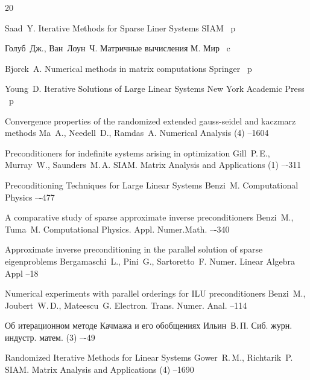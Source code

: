 \begin{thebibliography}{20}

\by Saad~Y.
\book Iterative Methods for Sparse Liner Systems
\publ SIAM
~p

\by Голуб~Дж., Ван~Лоун~Ч.
\book Матричные вычисления
\publaddr М.
\publ Мир
~c

\by Bjorck~A.
\book Numerical methods in matrix computations
\publ Springer
~p

\by Young~D.
\book Iterative Solutions of Large Linear Systems
\publaddr New York
\publ Academic Press
~p

\paper Convergence properties of the randomized extended gauss-seidel and kaczmarz methods
\by Ma~A., Needell~D., Ramdas~A.
\jour Numerical Analysis
(4)
--1604

\paper Preconditioners for indefinite systems arising in optimization
\by Gill~P.\,E., Murray~W., Saunders~M.\,A.
\jour SIAM. Matrix Analysis and Applications
(1)
–-311

\paper Preconditioning Techniques for Large Linear Systems
\by Benzi~M.
\jour Computational Physics
–-477

\paper A comparative study of sparse approximate inverse preconditioners
\by Benzi~M., Tuma~M.
\jour Computational Physics. Appl. Numer.Math.
–-340

\paper Approximate inverse preconditioning in the parallel solution of sparse eigenproblems
\by Bergamaschi~L., Pini~G., Sartoretto~F.
\jour Numer. Linear Algebra Appl
--18

\paper Numerical experiments with parallel orderings for ILU preconditioners
\by Benzi~M., Joubert~W.\,D., Mateescu~G.
\jour Electron. Trans. Numer. Anal.
--114

\paper Об итерационном методе Качмажа и его обобщениях
\by Ильин~В.\,П.
\jour Сиб. журн. индустр. матем.
(3)
–-49

\paper Randomized Iterative Methods for Linear Systems
\by Gower~R.\,M., Richtarik~P.
\jour SIAM. Matrix Analysis and Applications
(4)
--1690


\end{thebibliography}
